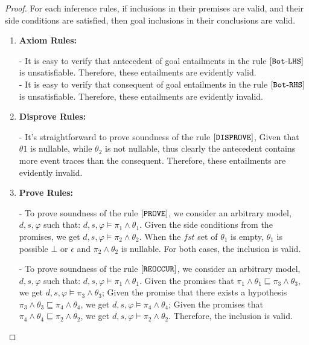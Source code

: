 \documentclass[acmsmall,10pt,review]{acmart}
\newcommand{\es}{\theta}
\newcommand{\code}[1]{{\tt{\ensuremath{\m{#1}}}}}
\newcommand{\codeme}[1]{{\tt{\ensuremath{#1}}}}
\newcommand{\CONTAIN}{\sqsubseteq}
\newcommand{\m}{\mathit}
\begin{document}
{{{ 

\begin{proof}
  For each inference rules, if inclusions in their premises are valid, and their side conditions are satisfied, then goal inclusions in their conclusions are valid.
  
  \begin{enumerate}
  \item \textbf{Axiom Rules:} 
  
  - It is easy to verify that antecedent of goal entailments in the rule $\codeme{[Bot\text{-}LHS]}$ is unsatisfiable. Therefore, these entailments are evidently valid.\\
  - It is easy to verify that consequent of goal entailments in the rule $\codeme{[Bot\text{-}RHS]}$ is unsatisfiable. Therefore, these entailments are evidently invalid.\\
  
  
  \item \textbf{Disprove Rules:} 
  
  - It's straightforward to prove soundness of the rule $\codeme{[DISPROVE]}$, Given that \codeme{\es1} is nullable, while \codeme{ \es_2} is not nullable, thus clearly the antecedent contains more event traces than the consequent.  Therefore, these entailments are evidently invalid.\\
  
  
  \item \textbf{Prove Rules:} 
  
  - To prove soundness of the rule $\codeme{[PROVE]}$, we consider an arbitrary model, \codeme{d, s, \varphi} such that:  
  \codeme{d,  s, \varphi \models  {\pi_1 \wedge \es_1}}. Given the side 
  conditions from the promises, we get \codeme{d,  s, \varphi \models 
  {\pi_2 \wedge \es_2}}. When the \code{\m{fst}} set of \code{\es_1} is 
  empty, \code{\es_1} is possible \code{\bot} or \code{\epsilon} and 
  \code{\pi_2 \wedge \es_2} is nullable. For both cases, the inclusion 
  is valid. 
  
  - To prove soundness of the rule $\codeme{[REOCCUR]}$, we consider 
  an arbitrary model, \codeme{d, s, \varphi} such that:  \codeme{d,  s, 
  \varphi \models  {\pi_1 \wedge \es_1}}. Given the promises that  
  \codeme{\pi_1 \wedge \es_1 \CONTAIN \pi_3 \wedge \es_3}, we get 
  \codeme{d,  s, \varphi \models {\pi_3 \wedge \es_3}}; Given the 
  promise that there exists a hypothesis \codeme{\pi_3 \wedge \es_3 
  \CONTAIN  \pi_4 \wedge \es_4}, we get \codeme{d, s, \varphi \models 
  {\pi_4 \wedge \es_4}}; Given the promises that  
  \codeme{\pi_4 \wedge \es_4 \CONTAIN \pi_2 \wedge \es_2}, we get 
  \codeme{d, s,  \varphi \models {\pi_2 \wedge \es_2}}. Therefore,  
  the inclusion is valid. 
  \\
  

\end{enumerate}
\end{proof}}}}
\end{document}
